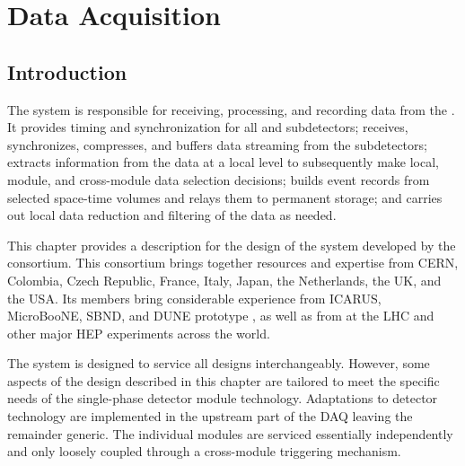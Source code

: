 \chapter{Data Acquisition}
\label{ch:sp-daq}

\section{Introduction}
\label{sec:fd-daq:introduction}

The   system is responsible for receiving,
processing, and recording data from the  .
It provides
timing and synchronization for all  and
subdetectors; receives, synchronizes, compresses, and buffers data
streaming from the subdetectors; extracts information from the data at a
local level to subsequently make local, module, and cross-module data
selection decisions; builds event records %
 from selected space-time volumes 
and relays them to permanent storage; and carries out local data
reduction and filtering of the data as needed.

This chapter provides a description for the design of the 
  system developed by the  
 consortium. 
This consortium brings together resources and expertise from CERN,
Colombia, Czech Republic, France, Italy, Japan, the Netherlands, the UK, and the USA. 
Its members bring considerable experience from ICARUS, MicroBooNE,
SBND, and
DUNE prototype , as well as from  at the LHC and other major
HEP experiments across the world.

The system is designed to service all   designs interchangeably. 
However, some aspects of the  design described in this chapter are tailored to meet the specific needs of the single-phase detector module technology. 
Adaptations to detector technology are implemented in the upstream part of the DAQ leaving the remainder generic.
The individual modules are serviced essentially independently and only loosely coupled through a cross-module triggering mechanism.

